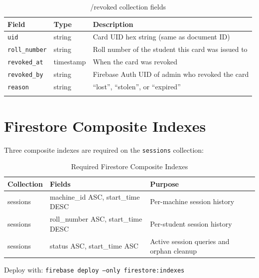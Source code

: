 \begin{longtable}{L{3cm}L{2.5cm}L{9cm}}
\toprule
\textbf{Field} & \textbf{Type} & \textbf{Description} \\
\midrule
\endhead
\texttt{uid} & string & Card UID hex string (same as document ID) \\
\texttt{roll\_number} & string & Roll number of the student this card was issued to \\
\texttt{revoked\_at} & timestamp & When the card was revoked \\
\texttt{revoked\_by} & string & Firebase Auth UID of admin who revoked the card \\
\texttt{reason} & string & ``lost'', ``stolen'', or ``expired'' \\
\bottomrule
\caption{/revoked collection fields}
\end{longtable}

\section{Firestore Composite Indexes}

Three composite indexes are required on the \texttt{sessions} collection:

\begin{table}[H]
\centering
\caption{Required Firestore Composite Indexes}
\begin{tabular}{L{3.5cm}L{4.5cm}L{6.5cm}}
\toprule
\textbf{Collection} & \textbf{Fields} & \textbf{Purpose} \\
\midrule
sessions & machine\_id ASC, start\_time DESC & Per-machine session history \\
sessions & roll\_number ASC, start\_time DESC & Per-student session history \\
sessions & status ASC, start\_time ASC & Active session queries and orphan cleanup \\
\bottomrule
\end{tabular}
\end{table}

Deploy with: \texttt{firebase deploy --only firestore:indexes}
